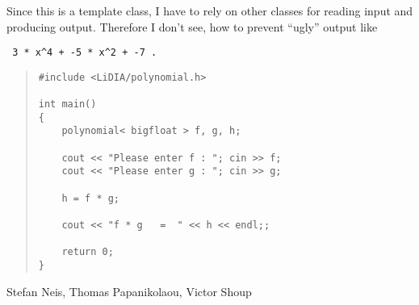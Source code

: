 \BUGS

Since this is a template class, I have to rely on other classes for reading input and producing
output.  Therefore I don't see, how to prevent ``ugly'' output like
\begin{verbatim} 3 * x^4 + -5 * x^2 + -7 .\end{verbatim}



\EXAMPLES

\begin{quote}
\begin{verbatim}
#include <LiDIA/polynomial.h>

int main()
{
    polynomial< bigfloat > f, g, h;

    cout << "Please enter f : "; cin >> f;
    cout << "Please enter g : "; cin >> g;

    h = f * g;

    cout << "f * g   =  " << h << endl;;

    return 0;
}
\end{verbatim}
\end{quote}



\AUTHOR

Stefan Neis, Thomas Papanikolaou, Victor Shoup
